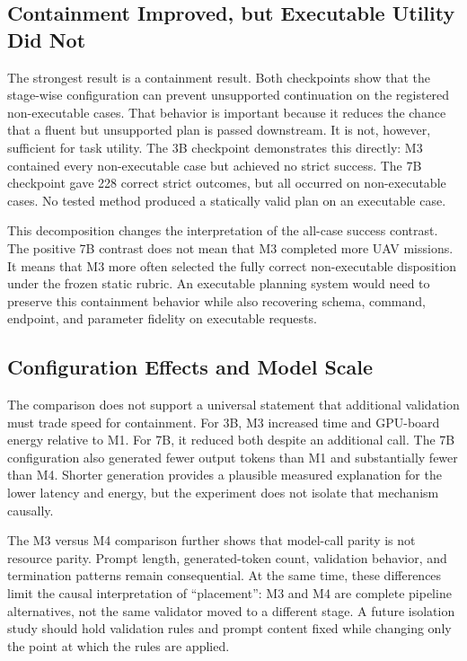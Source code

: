 \documentclass[conference]{IEEEtran}
\newcommand{\Mone}{\textsc{M1}\xspace}
\newcommand{\Mthree}{\textsc{M3}\xspace}
\newcommand{\Mfour}{\textsc{M4}\xspace}
\begin{document}
\subsection{Containment Improved, but Executable Utility Did Not}

The strongest result is a containment result. Both checkpoints show that the
stage-wise configuration can prevent unsupported continuation on the
registered non-executable cases. That behavior is important because it reduces
the chance that a fluent but unsupported plan is passed downstream. It is not,
however, sufficient for task utility. The 3B checkpoint demonstrates this
directly: \Mthree contained every non-executable case but achieved no strict
success. The 7B checkpoint gave 228 correct strict outcomes, but all occurred
on non-executable cases. No tested method produced a statically valid plan on
an executable case.

This decomposition changes the interpretation of the all-case success
contrast. The positive 7B contrast does not mean that \Mthree completed more
UAV missions. It means that \Mthree more often selected the fully correct
non-executable disposition under the frozen static rubric. An executable
planning system would need to preserve this containment behavior while also
recovering schema, command, endpoint, and parameter fidelity on executable
requests.

\subsection{Configuration Effects and Model Scale}

The comparison does not support a universal statement that additional
validation must trade speed for containment. For 3B, \Mthree increased time
and GPU-board energy relative to \Mone. For 7B, it reduced both despite an
additional call. The 7B configuration also generated fewer output tokens than
\Mone and substantially fewer than \Mfour. Shorter generation provides a
plausible measured explanation for the lower latency and energy, but the
experiment does not isolate that mechanism causally.

The \Mthree{} versus \Mfour comparison further shows that model-call parity is
not resource parity. Prompt length, generated-token count, validation behavior,
and termination patterns remain consequential. At the same time, these
differences limit the causal interpretation of ``placement'': \Mthree and
\Mfour are complete pipeline alternatives, not the same validator moved to a
different stage. A future isolation study should hold validation rules and
prompt content fixed while changing only the point at which the rules are
applied.
\end{document}
